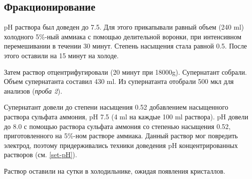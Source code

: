 \subsection{Фракционирование}
\label{2-frac-end}
pH раствора был доведен до 7.5.
Для этого прикапывали равный объем (240 ml) холодного 5\%-ный аммиака
с помощью делительной воронки, при интенсивном перемешивании в течении 30 минут.
Степень насыщения стала равной 0.5.
После этого оставили на 15 минут на холоде.

Затем раствор отцентрифугировали (20 минут при 18000g).
Супернатант собрали. Объем супернатанта составил 430 ml.
Из супернатанта отобрали 500 мкл для анализов (\emph{проба 2}).

Супернатант довели до степени насыщения 0.52 добавлением
насыщенного раствора сульфата аммония, pH 7.5 (4 ml  на каждые 100 ml раствора).
pH довели до 8.0 с помощью раствора сульфата аммония со степенью насыщения 0.52,
приготовленного на 5\%-ном растворе аммиака.
Данный раствор мог повредить электрод, поэтому придерживались
техники доведения pH концентрированных растворов (см. \ref{set-pH}).

Раствор оставили на сутки в холодильнике, ожидая появления кристаллов.

